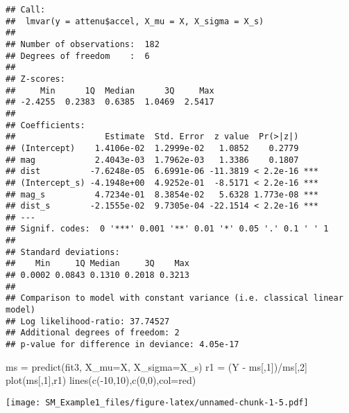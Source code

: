 \documentclass[
]{article}
\newenvironment{Shaded}{\begin{snugshade}}{\end{snugshade}}
\newcommand{\AttributeTok}[1]{\textcolor[rgb]{0.77,0.63,0.00}{#1}}
\newcommand{\DecValTok}[1]{\textcolor[rgb]{0.00,0.00,0.81}{#1}}
\newcommand{\FunctionTok}[1]{\textcolor[rgb]{0.00,0.00,0.00}{#1}}
\newcommand{\NormalTok}[1]{#1}
\newcommand{\OtherTok}[1]{\textcolor[rgb]{0.56,0.35,0.01}{#1}}
\newcommand{\SpecialCharTok}[1]{\textcolor[rgb]{0.00,0.00,0.00}{#1}}
\newcommand{\StringTok}[1]{\textcolor[rgb]{0.31,0.60,0.02}{#1}}
\begin{document}
\begin{verbatim}
## Call: 
##  lmvar(y = attenu$accel, X_mu = X, X_sigma = X_s)
## 
## Number of observations:  182 
## Degrees of freedom    :  6 
## 
## Z-scores: 
##     Min      1Q  Median      3Q     Max 
## -2.4255  0.2383  0.6385  1.0469  2.5417 
## 
## Coefficients:
##                  Estimate  Std. Error  z value  Pr(>|z|)    
## (Intercept)    1.4106e-02  1.2999e-02   1.0852    0.2779    
## mag            2.4043e-03  1.7962e-03   1.3386    0.1807    
## dist          -7.6248e-05  6.6991e-06 -11.3819 < 2.2e-16 ***
## (Intercept_s) -4.1948e+00  4.9252e-01  -8.5171 < 2.2e-16 ***
## mag_s          4.7234e-01  8.3854e-02   5.6328 1.773e-08 ***
## dist_s        -2.1555e-02  9.7305e-04 -22.1514 < 2.2e-16 ***
## ---
## Signif. codes:  0 '***' 0.001 '**' 0.01 '*' 0.05 '.' 0.1 ' ' 1
## 
## Standard deviations: 
##    Min     1Q Median     3Q    Max 
## 0.0002 0.0843 0.1310 0.2018 0.3213 
## 
## Comparison to model with constant variance (i.e. classical linear model)
## Log likelihood-ratio: 37.74527 
## Additional degrees of freedom: 2 
## p-value for difference in deviance: 4.05e-17
\end{verbatim}

\begin{Shaded}
\begin{Highlighting}[]
\NormalTok{ms }\OtherTok{=} \FunctionTok{predict}\NormalTok{(fit3, }\AttributeTok{X\_mu=}\NormalTok{X, }\AttributeTok{X\_sigma=}\NormalTok{X\_s)}
\NormalTok{r1 }\OtherTok{=}\NormalTok{ (Y }\SpecialCharTok{{-}}\NormalTok{ ms[,}\DecValTok{1}\NormalTok{])}\SpecialCharTok{/}\NormalTok{ms[,}\DecValTok{2}\NormalTok{]}
\FunctionTok{plot}\NormalTok{(ms[,}\DecValTok{1}\NormalTok{],r1)}
\FunctionTok{lines}\NormalTok{(}\FunctionTok{c}\NormalTok{(}\SpecialCharTok{{-}}\DecValTok{10}\NormalTok{,}\DecValTok{10}\NormalTok{),}\FunctionTok{c}\NormalTok{(}\DecValTok{0}\NormalTok{,}\DecValTok{0}\NormalTok{),}\AttributeTok{col=}\StringTok{\textquotesingle{}red\textquotesingle{}}\NormalTok{)}
\end{Highlighting}
\end{Shaded}

\texttt{[image: SM\_Example1\_files/figure-latex/unnamed-chunk-1-5.pdf]}
\end{document}
